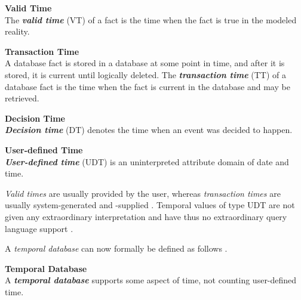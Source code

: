 \begin{svgraybox}
\vspace{-10pt}
\begin{definition}\textbf{Valid Time}\\
The \emph{\textbf{valid time}} (VT) of a fact is the time when the fact is true in the modeled reality.
\end{definition}

\begin{definition}\textbf{Transaction Time}\\
A database fact is stored in a database at some point in time, and after it is stored, it is current until logically deleted. The \emph{\textbf{transaction time}} (TT) of a database fact is the time when the fact is current in the database and may be retrieved.
\end{definition}

\begin{definition}\textbf{Decision Time}\\
\emph{\textbf{Decision time}} (DT) denotes the time when an event was decided to happen.
\end{definition}

\begin{definition}\textbf{User-defined Time}\\
\emph{\textbf{User-defined time}} (UDT) is an uninterpreted attribute domain of date and time.
\end{definition}
\vspace{-10pt}
\end{svgraybox}

\emph{Valid times} are usually provided by the user, whereas \emph{transaction times} are usually system-generated and -supplied \cite{Dyreson1994}. Temporal values of type UDT are not given any extraordinary interpretation and have thus no extraordinary query language support \cite{Dyreson1994}.

A \emph{temporal database} can now formally be defined as follows \cite{Dyreson1994}.

\begin{svgraybox}
\vspace{-10pt}
\begin{definition}\textbf{Temporal Database}\\
A \emph{\textbf{temporal database}} supports some aspect of time, not counting user-defined time.
\end{definition}
\vspace{-10pt}
\end{svgraybox}

